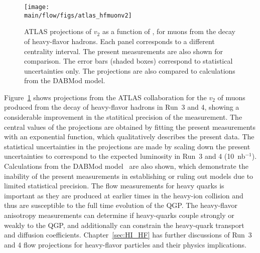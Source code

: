 \begin{figure}[!htb]
\begin{center}
\texttt{[image: \\main/flow/figs/atlas\_hfmuonv2]}
\caption{
ATLAS projections of $v_2$ as a function of \pt, for muons from the decay of 
  heavy-flavor hadrons. 
Each panel corresponds to a different centrality interval. 
The present measurements are also shown for comparison. 
The error bars (shaded boxes) correspond to statistical uncertainties only. 
The projections are also compared to calculations from the DABMod model.}
\label{fig:atlas_hf_v2}
\end{center}
\end{figure}

Figure~\ref{fig:atlas_hf_v2} shows projections from the ATLAS collaboration
  for the $v_2$ of muons produced from the decay of heavy-flavor hadrons
  in Run~3 and 4, showing a considerable improvement in the statitical 
  precision of the measurement.
The central values of the projections are obtained by fitting the 
  present measurements with an exponential function, which qualitatively 
  describes the present data. 
The statistical uncertainties in the projections are made by scaling down 
  the present uncertainties to correspond to the expected luminosity in 
  Run~3 and 4 (10~nb$^{-1}$).
Calculations from the DABMod model~\cite{Prado:2016szr} are also shown,
  which demonstrate the inability of the present measurements
  in establishing or ruling out models due to limited statistical precision.
The flow measurements for heavy quarks is important as they are produced at
  earlier times in the heavy-ion collision and thus are susceptible
  to the full time evolution of the QGP.
The heavy-flavor anisotropy measurements can determine if heavy-quarks couple 
  strongly or weakly to the QGP, and additionally can constrain the heavy-quark 
  transport and diffusion coefficients.
Chapter~\ref{sec:HI_HF} has further discussions of Run~3 and 4 flow projections
  for heavy-flavor particles and their physics implications. 


